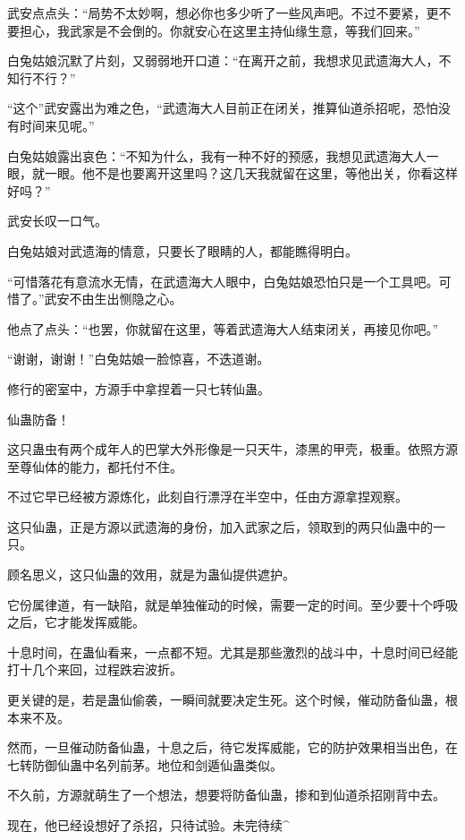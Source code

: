 \begin{this_body}
武安点点头：“局势不太妙啊，想必你也多少听了一些风声吧。不过不要紧，更不要担心，我武家是不会倒的。你就安心在这里主持仙缘生意，等我们回来。”

白兔姑娘沉默了片刻，又弱弱地开口道：“在离开之前，我想求见武遗海大人，不知行不行？”

“这个”武安露出为难之色，“武遗海大人目前正在闭关，推算仙道杀招呢，恐怕没有时间来见呢。”

白兔姑娘露出哀色：“不知为什么，我有一种不好的预感，我想见武遗海大人一眼，就一眼。他不是也要离开这里吗？这几天我就留在这里，等他出关，你看这样好吗？”

武安长叹一口气。

白兔姑娘对武遗海的情意，只要长了眼睛的人，都能瞧得明白。

“可惜落花有意流水无情，在武遗海大人眼中，白兔姑娘恐怕只是一个工具吧。可惜了。”武安不由生出恻隐之心。

他点了点头：“也罢，你就留在这里，等着武遗海大人结束闭关，再接见你吧。”

“谢谢，谢谢！”白兔姑娘一脸惊喜，不迭道谢。

修行的密室中，方源手中拿捏着一只七转仙蛊。

仙蛊防备！

这只蛊虫有两个成年人的巴掌大外形像是一只天牛，漆黑的甲壳，极重。依照方源至尊仙体的能力，都托付不住。

不过它早已经被方源炼化，此刻自行漂浮在半空中，任由方源拿捏观察。

这只仙蛊，正是方源以武遗海的身份，加入武家之后，领取到的两只仙蛊中的一只。

顾名思义，这只仙蛊的效用，就是为蛊仙提供遮护。

它份属律道，有一缺陷，就是单独催动的时候，需要一定的时间。至少要十个呼吸之后，它才能发挥威能。

十息时间，在蛊仙看来，一点都不短。尤其是那些激烈的战斗中，十息时间已经能打十几个来回，过程跌宕波折。

更关键的是，若是蛊仙偷袭，一瞬间就要决定生死。这个时候，催动防备仙蛊，根本来不及。

然而，一旦催动防备仙蛊，十息之后，待它发挥威能，它的防护效果相当出色，在七转防御仙蛊中名列前茅。地位和剑遁仙蛊类似。

不久前，方源就萌生了一个想法，想要将防备仙蛊，掺和到仙道杀招刚背中去。

现在，他已经设想好了杀招，只待试验。未完待续\^{}

\end{this_body}

